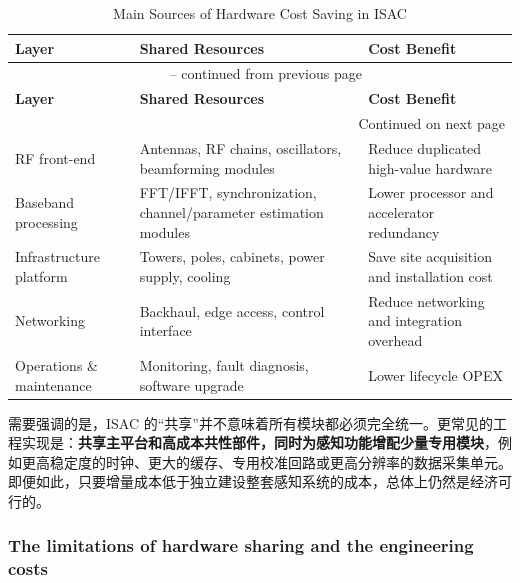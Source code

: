 \begin{longtable}{p{3.3cm}p{4.8cm}p{5.2cm}}
\caption{Main Sources of Hardware Cost Saving in ISAC}
\label{tab:isac-hardware-saving} \\
\hline
\textbf{Layer} & \textbf{Shared Resources} & \textbf{Cost Benefit} \\
\hline
\endfirsthead

\multicolumn{3}{c}{\tablename~\thetable{} -- continued from previous page} \\
\hline
\textbf{Layer} & \textbf{Shared Resources} & \textbf{Cost Benefit} \\
\hline
\endhead

\hline
\multicolumn{3}{r}{Continued on next page} \\
\endfoot

\hline \hline
\endlastfoot

RF front-end & Antennas, RF chains, oscillators, beamforming modules & Reduce duplicated high-value hardware \\
Baseband processing & FFT/IFFT, synchronization, channel/parameter estimation modules & Lower processor and accelerator redundancy \\
Infrastructure platform & Towers, poles, cabinets, power supply, cooling & Save site acquisition and installation cost \\
Networking & Backhaul, edge access, control interface & Reduce networking and integration overhead \\
Operations \& maintenance & Monitoring, fault diagnosis, software upgrade & Lower lifecycle OPEX \\
\end{longtable}

需要强调的是，ISAC 的“共享”并不意味着所有模块都必须完全统一。更常见的工程实现是：\textbf{共享主平台和高成本共性部件，同时为感知功能增配少量专用模块}，例如更高稳定度的时钟、更大的缓存、专用校准回路或更高分辨率的数据采集单元。即便如此，只要增量成本低于独立建设整套感知系统的成本，总体上仍然是经济可行的\cite{Liu2022ISAC, Wei2023Integrated}。

\subsubsection{The limitations of hardware sharing and the engineering costs}
\label{subsubsec:ch1-isac-core value-hardware-limitations}


